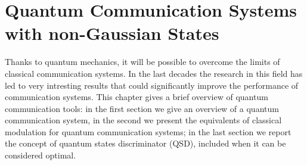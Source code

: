 
\chapter[Quantum Communication Systems]{Quantum Communication Systems with non-Gaussian States}
    Thanks to quantum mechanics, it will be possible to overcome the limits of classical 
    communication systems. In the last decades the research in this field has led to very 
    intresting results that could significantly improve the performance of communication systems. 
    This chapter gives a brief overview of quantum communication tools: in the first section we
    give an overview of a quantum communication system, in the second we present the equivalents 
    of classical modulation for quantum communication systems; in the last 
    section we report the concept of quantum states discriminator (QSD), included when it can be 
    considered optimal.

    
    
    